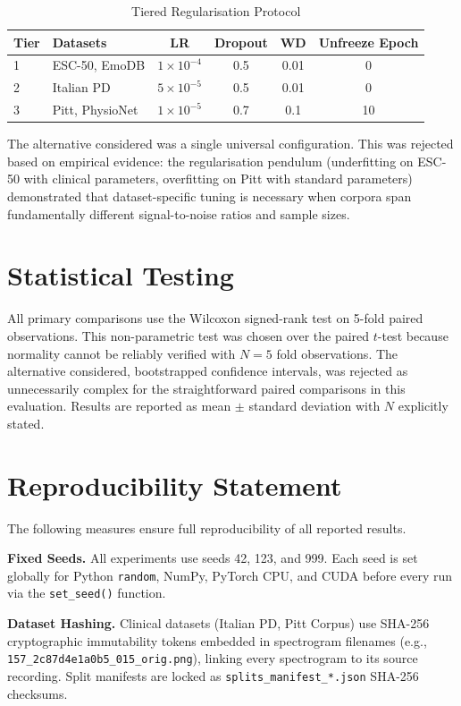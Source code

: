 \documentclass[oneside,openany]{final_report}
\begin{document}
\begin{table}[H]
\centering
\caption{Tiered Regularisation Protocol}
\label{tab:tiers}
\begin{tabular}{l l c c c c}
\toprule
\textbf{Tier} & \textbf{Datasets} & \textbf{LR} & \textbf{Dropout} & \textbf{WD} & \textbf{Unfreeze Epoch} \\
\midrule
1 & ESC-50, EmoDB & $1 \times 10^{-4}$ & 0.5 & 0.01 & 0 \\
2 & Italian PD & $5 \times 10^{-5}$ & 0.5 & 0.01 & 0 \\
3 & Pitt, PhysioNet & $1 \times 10^{-5}$ & 0.7 & 0.1 & 10 \\
\bottomrule
\end{tabular}
\end{table}

The alternative considered was a single universal configuration. This was rejected based on empirical evidence: the regularisation pendulum (underfitting on ESC-50 with clinical parameters, overfitting on Pitt with standard parameters) demonstrated that dataset-specific tuning is necessary when corpora span fundamentally different signal-to-noise ratios and sample sizes.

\section{Statistical Testing}

All primary comparisons use the Wilcoxon signed-rank test on 5-fold paired observations. This non-parametric test was chosen over the paired $t$-test because normality cannot be reliably verified with $N\!=\!5$ fold observations. The alternative considered, bootstrapped confidence intervals, was rejected as unnecessarily complex for the straightforward paired comparisons in this evaluation. Results are reported as mean $\pm$ standard deviation with $N$ explicitly stated.

\section{Reproducibility Statement}

The following measures ensure full reproducibility of all reported results.

\textbf{Fixed Seeds.} All experiments use seeds 42, 123, and 999. Each seed is set globally for Python \texttt{random}, NumPy, PyTorch CPU, and CUDA before every run via the \texttt{set\_seed()} function.

\textbf{Dataset Hashing.} Clinical datasets (Italian PD, Pitt Corpus) use SHA-256 cryptographic immutability tokens embedded in spectrogram filenames (e.g., \texttt{157\_2c87d4e1a0b5\_015\_orig.png}), linking every spectrogram to its source recording. Split manifests are locked as \texttt{splits\_manifest\_*.json} SHA-256 checksums.
\end{document}
